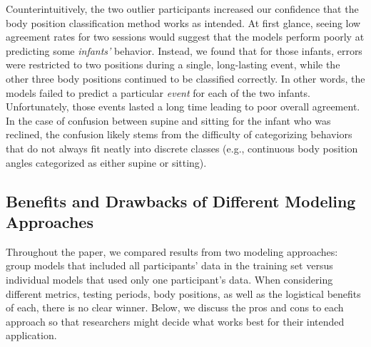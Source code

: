 \documentclass[
  man]{apa6}
\begin{document}
Counterintuitively, the two outlier participants increased our confidence that the body position classification method works as intended. At first glance, seeing low agreement rates for two sessions would suggest that the models perform poorly at predicting some \emph{infants'} behavior. Instead, we found that for those infants, errors were restricted to two positions during a single, long-lasting event, while the other three body positions continued to be classified correctly. In other words, the models failed to predict a particular \emph{event} for each of the two infants. Unfortunately, those events lasted a long time leading to poor overall agreement. In the case of confusion between supine and sitting for the infant who was reclined, the confusion likely stems from the difficulty of categorizing behaviors that do not always fit neatly into discrete classes (e.g., continuous body position angles categorized as either supine or sitting).

\hypertarget{benefits-and-drawbacks-of-different-modeling-approaches}{%
\subsection{Benefits and Drawbacks of Different Modeling Approaches}\label{benefits-and-drawbacks-of-different-modeling-approaches}}

Throughout the paper, we compared results from two modeling approaches: group models that included all participants' data in the training set versus individual models that used only one participant's data. When considering different metrics, testing periods, body positions, as well as the logistical benefits of each, there is no clear winner. Below, we discuss the pros and cons to each approach so that researchers might decide what works best for their intended application.
\end{document}
